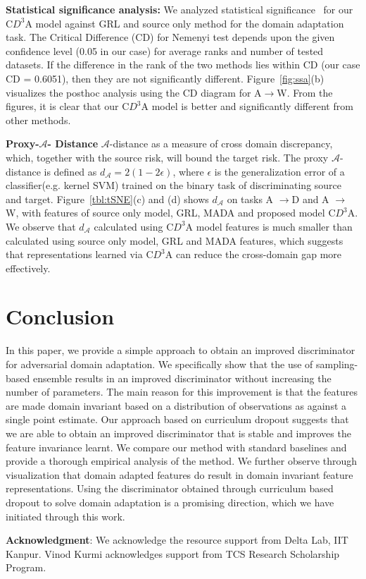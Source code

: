 \documentclass{bmvc2k}
\begin{document}
\noindent\textbf{{Statistical significance analysis:}}
We analyzed statistical significance~\cite{demvsar_JMLR2006} for our C$D^{3}$A model against GRL\cite{ganin_ICML2015} and source only method for the domain adaptation task. The Critical Difference (CD) for Nemenyi test depends upon the given confidence level (0.05 in our case) for average ranks and  number of tested datasets. If the difference in the rank of the two methods lies within CD (our case CD = 0.6051), then they are not significantly different. Figure~\ref{fig:ssa}(b) visualizes the posthoc analysis using the CD diagram for A$\rightarrow$W. From the figures, it is clear that our C$D^{3}$A model is better and significantly different from other methods.







 




\noindent\textbf{{Proxy-$\mathcal{A}$- Distance}}
  $\mathcal{A}$-distance as a measure of cross domain discrepancy\cite{ben_ML2010}, which, together with the source risk, will bound the target risk. The proxy $\mathcal{A}$-distance is defined as $d_\mathcal{A} = 2 (1 - 2\epsilon)$, where $ \epsilon $ is the generalization error of a classifier(e.g. kernel SVM) trained on the binary task of discriminating source and target. Figure~\ref{tbl:tSNE}(c) and (d) shows $d_\mathcal{A}$ on tasks A $\rightarrow $D and  A $\rightarrow $W, with features of source only model\cite{krizhevsky_NIPS2012}, GRL\cite{ganin_ICML2015}, MADA\cite{pei_arxiv2018} and proposed model C$D^{3}$A. We observe that $d_\mathcal{A}$ calculated using C$D^{3}$A model features is much smaller than calculated using source only model, GRL and MADA features, which suggests that representations learned via C$D^{3}$A can reduce the cross-domain gap more effectively. 
\section{Conclusion}
In this paper, we provide a simple approach to obtain an improved discriminator for adversarial domain adaptation. We specifically show that the use of sampling-based ensemble results in an improved discriminator without increasing the number of parameters. The main reason for this improvement is that the features are made domain invariant based on a distribution of observations as against a single point estimate. Our approach based on curriculum dropout suggests that we are able to obtain an improved discriminator that is stable and improves the feature invariance learnt. We compare our method with standard baselines and provide a thorough empirical analysis of the method. We further observe through visualization that domain adapted features do result in domain invariant feature representations. 
Using the discriminator obtained through curriculum based dropout to solve domain adaptation is a promising direction, which we have initiated through this work.

\textbf{Acknowledgment}:  We acknowledge the resource support from Delta Lab, IIT Kanpur. Vinod Kurmi acknowledges support from TCS Research Scholarship Program.
\newpage


\end{document}
